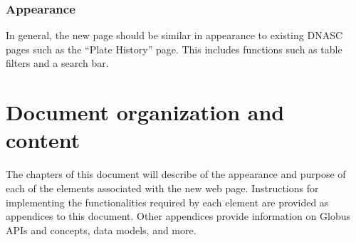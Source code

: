 \subsubsection{Appearance}
In general, the new page should be similar in appearance to existing DNASC pages such as 
the ``Plate History'' page. This includes functions such as table filters and a search bar. 

\section{Document organization and content}

The chapters of this document will describe of the appearance and purpose of each of the
elements associated with the new web page. Instructions for implementing the 
functionalities required by each element are provided as appendices to this document. 
Other appendices provide information on Globus APIs and concepts, data models, and more.
